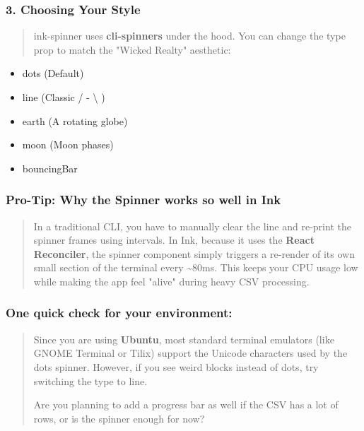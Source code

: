 \documentclass[
]{article}
\begin{document}
\hypertarget{choosing-your-style}{%
\subsubsection{\texorpdfstring{\textbf{3. Choosing Your
Style}}{3. Choosing Your Style}}\label{choosing-your-style}}

\begin{quote}
ink-spinner uses \textbf{cli-spinners} under the hood. You can change
the type prop to match the "Wicked Realty" aesthetic:
\end{quote}

\begin{itemize}
\item
  dots (Default)
\item
  line (Classic / - \textbackslash{} \textbar)
\item
  earth (A rotating globe)
\item
  moon (Moon phases)
\item
  bouncingBar
\end{itemize}

\hypertarget{pro-tip-why-the-spinner-works-so-well-in-ink}{%
\subsubsection{\texorpdfstring{\textbf{Pro-Tip: Why the Spinner works so
well in
Ink}}{Pro-Tip: Why the Spinner works so well in Ink}}\label{pro-tip-why-the-spinner-works-so-well-in-ink}}

\begin{quote}
In a traditional CLI, you have to manually clear the line and re-print
the spinner frames using intervals. In Ink, because it uses the
\textbf{React Reconciler}, the spinner component simply triggers a
re-render of its own small section of the terminal every
\textasciitilde80ms. This keeps your CPU usage low while making the app
feel "alive" during heavy CSV processing.
\end{quote}

\hypertarget{one-quick-check-for-your-environment}{%
\subsubsection{\texorpdfstring{\textbf{One quick check for your
environment:}}{One quick check for your environment:}}\label{one-quick-check-for-your-environment}}

\begin{quote}
Since you are using \textbf{Ubuntu}, most standard terminal emulators
(like GNOME Terminal or Tilix) support the Unicode characters used by
the dots spinner. However, if you see weird blocks instead of dots, try
switching the type to line.

Are you planning to add a progress bar as well if the CSV has a lot of
rows, or is the spinner enough for now?
\end{quote}
\end{document}
